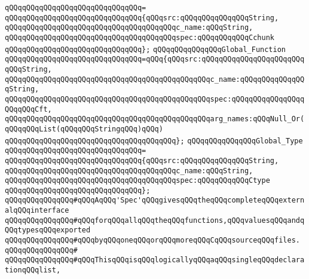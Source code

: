 \verb|qQQqqQQqqQQqqQQqqQQqqQQqqQQqqQQq=|\newline
\verb|qQQqqQQqqQQqqQQqqQQqqQQqqQQqqQQq{qQQqsrc:qQQqqQQqqQQqqQQqString,|\newline
\verb|qQQqqQQqqQQqqQQqqQQqqQQqqQQqqQQqqQQqqQQqc_name:qQQqString,|\newline
\verb|qQQqqQQqqQQqqQQqqQQqqQQqqQQqqQQqqQQqqQQqspec:qQQqqQQqqQQqCchunk|\newline
\verb|qQQqqQQqqQQqqQQqqQQqqQQqqQQqqQQq};|\newline
\newline
\verb|qQQqqQQqqQQqqQQqGlobal_Function|\newline
\verb|qQQqqQQqqQQqqQQqqQQqqQQqqQQqqQQq=qQQq{qQQqsrc:qQQqqQQqqQQqqQQqqQQqqQQqqQQqString,|\newline
\verb|qQQqqQQqqQQqqQQqqQQqqQQqqQQqqQQqqQQqqQQqqQQqqQQqc_name:qQQqqQQqqQQqqQQqString,|\newline
\verb|qQQqqQQqqQQqqQQqqQQqqQQqqQQqqQQqqQQqqQQqqQQqqQQqspec:qQQqqQQqqQQqqQQqqQQqqQQqCft,|\newline
\verb|qQQqqQQqqQQqqQQqqQQqqQQqqQQqqQQqqQQqqQQqqQQqqQQqarg_names:qQQqNull_Or(qQQqqQQqList(qQQqqQQqStringqQQq)qQQq)|\newline
\verb|qQQqqQQqqQQqqQQqqQQqqQQqqQQqqQQqqQQqqQQq};|\newline
\newline
\verb|qQQqqQQqqQQqqQQqGlobal_Type|\newline
\verb|qQQqqQQqqQQqqQQqqQQqqQQqqQQqqQQq=|\newline
\verb|qQQqqQQqqQQqqQQqqQQqqQQqqQQqqQQq{qQQqsrc:qQQqqQQqqQQqqQQqString,|\newline
\verb|qQQqqQQqqQQqqQQqqQQqqQQqqQQqqQQqqQQqqQQqc_name:qQQqString,|\newline
\verb|qQQqqQQqqQQqqQQqqQQqqQQqqQQqqQQqqQQqqQQqspec:qQQqqQQqqQQqCtype|\newline
\verb|qQQqqQQqqQQqqQQqqQQqqQQqqQQqqQQq};|\newline
\newline
\newline
\verb|qQQqqQQqqQQqqQQq#qQQqAqQQq'Spec'qQQqgivesqQQqtheqQQqcompleteqQQqexternalqQQqinterface|\newline
\verb|qQQqqQQqqQQqqQQq#qQQqforqQQqallqQQqtheqQQqfunctions,qQQqvaluesqQQqandqQQqtypesqQQqexported|\newline
\verb|qQQqqQQqqQQqqQQq#qQQqbyqQQqoneqQQqorqQQqmoreqQQqCqQQqsourceqQQqfiles.|\newline
\verb|qQQqqQQqqQQqqQQq#|\newline
\verb|qQQqqQQqqQQqqQQq#qQQqThisqQQqisqQQqlogicallyqQQqaqQQqsingleqQQqdeclarationqQQqlist,|\newline
